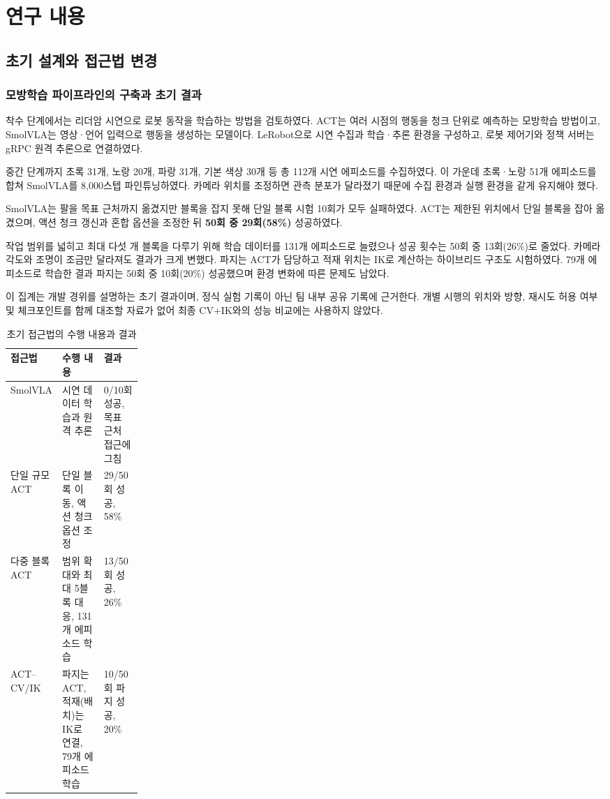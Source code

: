 \chapter{연구 내용}
\section{초기 설계와 접근법 변경}
\subsection{모방학습 파이프라인의 구축과 초기 결과}
착수 단계에서는 리더암 시연으로 로봇 동작을 학습하는 방법을 검토하였다. ACT는 여러 시점의 행동을 청크 단위로 예측하는 모방학습 방법이고\cite{act}, SmolVLA는 영상·언어 입력으로 행동을 생성하는 모델이다\cite{smolvla}. LeRobot으로 시연 수집과 학습·추론 환경을 구성하고, 로봇 제어기와 정책 서버는 gRPC 원격 추론으로 연결하였다.

중간 단계까지 초록 31개, 노랑 20개, 파랑 31개, 기본 색상 30개 등 총 112개 시연 에피소드를 수집하였다. 이 가운데 초록·노랑 51개 에피소드를 합쳐 SmolVLA를 8,000스텝 파인튜닝하였다. 카메라 위치를 조정하면 관측 분포가 달라졌기 때문에 수집 환경과 실행 환경을 같게 유지해야 했다.

SmolVLA는 팔을 목표 근처까지 옮겼지만 블록을 잡지 못해 단일 블록 시험 10회가 모두 실패하였다. ACT는 제한된 위치에서 단일 블록을 잡아 옮겼으며, 액션 청크 갱신과 혼합 옵션을 조정한 뒤 \textbf{50회 중 29회(58\%)} 성공하였다.

작업 범위를 넓히고 최대 다섯 개 블록을 다루기 위해 학습 데이터를 131개 에피소드로 늘렸으나 성공 횟수는 50회 중 13회(26\%)로 줄었다. 카메라 각도와 조명이 조금만 달라져도 결과가 크게 변했다. 파지는 ACT가 담당하고 적재 위치는 IK로 계산하는 하이브리드 구조도 시험하였다. 79개 에피소드로 학습한 결과 파지는 50회 중 10회(20\%) 성공했으며 환경 변화에 따른 문제도 남았다.

이 집계는 개발 경위를 설명하는 초기 결과이며, 정식 실험 기록이 아닌 팀 내부 공유 기록에 근거한다. 개별 시행의 위치와 방향, 재시도 허용 여부 및 체크포인트를 함께 대조할 자료가 없어 최종 CV+IK와의 성능 비교에는 사용하지 않았다.

\begin{table}[htbp]
\centering
\caption{초기 접근법의 수행 내용과 결과}\label{tab:early}
\begin{tabularx}{\linewidth}{@{}L{0.22\linewidth}YY@{}}
\toprule
접근법 & 수행 내용 & 결과 \\
\midrule
SmolVLA & 시연 데이터 학습과 원격 추론 & 0/10회 성공, 목표 근처 접근에 그침 \\
단일 규모 ACT & 단일 블록 이동, 액션 청크 옵션 조정 & 29/50회 성공, 58\% \\
다중 블록 ACT & 범위 확대와 최대 5블록 대응, 131개 에피소드 학습 & 13/50회 성공, 26\% \\
ACT--CV/IK & 파지는 ACT, 적재(배치)는 IK로 연결, 79개 에피소드 학습 & 10/50회 파지 성공, 20\% \\
\bottomrule
\end{tabularx}
\end{table}

